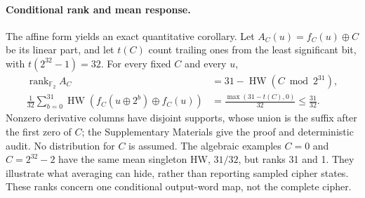 \paragraph{Conditional rank and mean response.}

The affine form yields an exact quantitative corollary. Let $A_C(u)=f_C(u)\oplus C$ be its linear part, and let $t(C)$ count trailing ones from the least significant bit, with $t(2^{32}-1)=32$. For every fixed $C$ and every $u$,
\begin{equation}
\begin{aligned}
 \operatorname{rank}_{\mathbb F_2} A_C
   &=31-\operatorname{HW}(C\bmod 2^{31}),\\
 \frac{1}{32}\sum_{b=0}^{31}\operatorname{HW}\!\left(f_C(u\oplus2^b)\oplus f_C(u)\right)
   &=\frac{\max(31-t(C),0)}{32}\leq\frac{31}{32}.
\end{aligned}
\label{eq:affinecorollary}
\end{equation}
Nonzero derivative columns have disjoint supports, whose union is the suffix after the first zero of $C$; the Supplementary Materials give the proof and deterministic audit. No distribution for $C$ is assumed. The algebraic examples $C=0$ and $C=2^{32}-2$ have the same mean singleton HW, $31/32$, but ranks 31 and 1. They illustrate what averaging can hide, rather than reporting sampled cipher states. These ranks concern one conditional output-word map, not the complete cipher.
